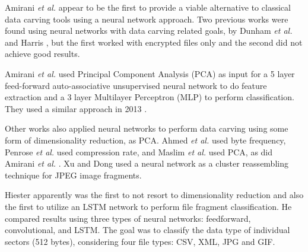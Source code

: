 
Amirani \textit{et al.}  \cite{amirani_new_2008} appear to be the first 
to provide a viable alternative to classical data carving tools using a neural network approach. Two previous works were found using neural networks with data carving related goals, by Dunham \textit{et al.} \cite{dunham_classifying_2005} and Harris \cite{harris_using_2007}, but the first worked with encrypted files only and the second did not achieve good results.

Amirani \textit{et al.}  \cite{amirani_new_2008} used Principal Component Analysis (PCA) as input for a 5 layer feed-forward auto-associative unsupervised neural network to do feature extraction and a 3 layer Multilayer Perceptron (MLP) to perform classification. They used a similar approach in 2013 \cite{amirani_feature-based_2013}.

Other works also applied neural networks to perform data carving using some form of dimensionality reduction, as PCA. Ahmed \textit{et al.} \cite{ahmed_content-based_2010}\cite{ahmed_fast_2011} used byte frequency, 
Penrose \textit{et al.} \cite{penrose_approaches_2013} used compression rate,
and Maslim \textit{et al.} \cite{maslim_distributed_2014} used PCA, as did Amirani \textit{et al.}  \cite{amirani_new_2008}.
Xu and Dong \cite{xu_reassembling_2009} used a neural network as a cluster reassembling technique for JPEG image fragments.

Hiester \cite{hiester_file_2018} apparently was the first to not resort to dimensionality reduction and also the first to utilize an LSTM network to perform file fragment classification. He compared results using three types of neural networks: feedforward, convolutional, and LSTM. The goal was to classify the data type of individual sectors (512 bytes), considering four file types: CSV, XML, JPG and GIF.

% 